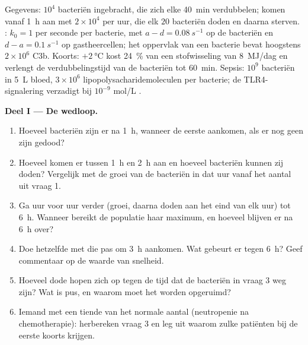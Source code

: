 \begin{problem}
\label{pb:b3:innate-immunity:1}
Gegevens: $10^{4}$ bacteriën ingebracht, die zich elke \qty{40}{min}
verdubbelen;  komen vanaf \qty{1}{h} aan met
$2\times 10^{4}$ per uur, die elk $20$ bacteriën doden en daarna
sterven. : $k_{0} = 1$ per seconde per bacterie, met
$a - d = \qty{0.08}{s^{-1}}$ op de bacteriën en $d - a =
\qty{0.1}{s^{-1}}$ op gastheercellen; het oppervlak van een bacterie
bevat hoogstens $2\times 10^{6}$ C3b. Koorts: $+\qty{2}{\celsius}$ kost
\qty{24}{\%} van een stofwisseling van \qty{8}{MJ/dag} en verlengt de
verdubbelingstijd van de bacteriën tot \qty{60}{min}. Sepsis: $10^{9}$
bacteriën in \qty{5}{L} bloed, $3\times 10^{6}$
lipopolysacharidemoleculen per bacterie; de TLR4-signalering verzadigt
bij $10^{-9}$ mol/L .

\medskip
\noindent\textbf{Deel I --- De wedloop.}
\begin{enumerate}
  \item Hoeveel bacteriën zijn er na \qty{1}{h}, wanneer de eerste
         aankomen, als er nog geen zijn gedood?
  \item Hoeveel  komen er tussen \qty{1}{h} en \qty{2}{h}
        aan en hoeveel bacteriën kunnen zij doden? Vergelijk met de
        groei van de bacteriën in dat uur vanaf het aantal uit vraag 1.
  \item Ga uur voor uur verder (groei, daarna doden aan het eind van
        elk uur) tot \qty{6}{h}. Wanneer bereikt de populatie haar
        maximum, en hoeveel blijven er na \qty{6}{h} over?
  \item Doe hetzelfde met  die pas om \qty{3}{h} aankomen.
        Wat gebeurt er tegen \qty{6}{h}? Geef commentaar op de waarde
        van snelheid.
  \item Hoeveel dode  hopen zich op tegen de tijd dat de
        bacteriën in vraag 3 weg zijn? Wat is pus, en waarom moet het
        worden opgeruimd?
  \item Iemand met een tiende van het normale aantal 
        (neutropenie na chemotherapie): herbereken vraag 3 en leg uit
        waarom zulke patiënten bij de eerste koorts 
        krijgen.
\end{enumerate}


\end{problem}
